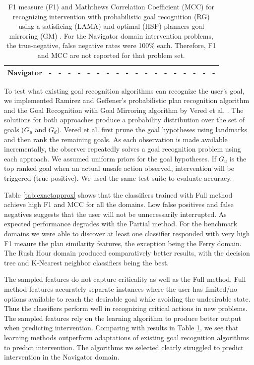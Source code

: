 \documentclass[letterpaper]{article}
\theoremstyle{plain}
\begin{document}
\begin{table}[tb]
{{\begin{tabular}{|l|ll|ll|ll|ll|ll|ll|ll|ll|ll|}
\textbf{Navigator}                            & -                       & -                        & -                       & -   & -                       & -   & -                        & -   & -                       & -   & -                       & -   & -                        & -   & -                       & -   & -                       & -   \\ \hline
\end{tabular}%
} %
} %
\caption{F1 measure (F1) and Maththews Correlation Coefficient (MCC) for recognizing intervention with probabilistic goal recognition (RG)  \cite{ramirez2010probabilistic} using a satisficing (LAMA) and optimal (HSP) planners goal mirroring (GM) \cite{vered2018goalrec}. For the Navigator domain intervention problems, the true-negative, false negative rates were 100\%  each. Therefore, F1 and MCC are not reported for that problem set.}
\label{tab:rgv}
\end{table}

To test what existing goal recognition algorithms can recognize the user's goal, we implemented Ramirez and Geffener's probabilistic plan recognition algorithm \cite{ramirez2010probabilistic} and the Goal Recognition with Goal Mirroring algorithm by Vered et al. . The solutions for both approaches produce a probability distribution over the set of goals ($G_u$ and $G_d$). Vered et al. first prune the goal hypotheses using landmarks and then rank the remaining goals. As each observation is made available incrementally, the observer repeatedly solves a goal recognition problem using each approach. We assumed uniform priors for the goal hypotheses. If $G_u$ is the top ranked goal when an actual unsafe action observed, intervention will be triggered (true positive). We used the same test suite to evaluate accuracy.

Table \ref{tab:exactapprox} shows that the classifiers trained with Full method achieve high F1  and MCC for all the domains. Low false positives and false negatives suggests that the user will not be unnecessarily interrupted. As expected performance degrades with the Partial method. For the benchmark domains we were able to discover at least one classifier responded with very high F1 meaure the plan similarity features, the exception being the Ferry domain. The Rush Hour domain produced comparatively better results, with the decision tree and K-Nearest neighbor classifiers being the best. 


The sampled features do not capture criticality as well as the Full method. Full method features accurately separate instances where the user has limited/no options available to reach the desirable goal while avoiding the undesirable state. Thus the classifiers perform well in recognizing critical actions in new problems. The sampled features rely on the learning algorithm to produce better output when predicting intervention. 
Comparing with results in Table \ref{tab:rgv}, we see that learning methods outperform adaptations of existing goal recognition algorithms to predict intervention. The algorithms we selected clearly struggled to predict intervention in the Navigator domain. 
\end{document}
